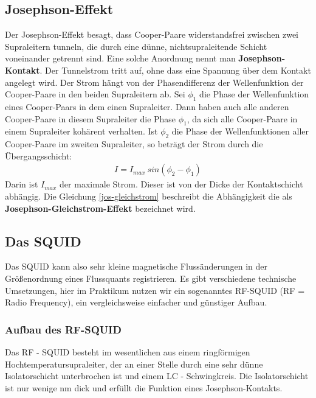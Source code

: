 \documentclass[12pt]{article}
\begin{document}
\subsection{Josephson-Effekt}
\label{josephson}

Der Josephson-Effekt besagt, dass Cooper-Paare widerstandsfrei zwischen zwei Supraleitern tunneln, die durch eine dünne, nichtsupraleitende Schicht voneinander getrennt sind. Eine solche Anordnung nennt man \textbf{Josephson-Kontakt}. Der Tunnelstrom tritt auf, ohne dass eine Spannung über dem Kontakt angelegt wird. Der Strom hängt von der Phasendifferenz der Wellenfunktion der Cooper-Paare in den beiden Supraleitern ab. Sei $\phi_1$ die Phase der Wellenfunktion eines Cooper-Paars in dem einen Supraleiter. Dann haben auch alle anderen Cooper-Paare in diesem Supraleiter die Phase $\phi_1$, da sich alle Cooper-Paare in einem Supraleiter kohärent verhalten. Ist $\phi_2$ die Phase der Wellenfunktionen aller Cooper-Paare im zweiten Supraleiter, so beträgt der Strom durch die Übergangsschicht:
\begin{align}
\label{jos-gleichstrom}
 I = I_{max}~sin(\phi_2 - \phi_1)
\end{align}
Darin ist $I_{max}$ der maximale Strom. Dieser ist von der Dicke der Kontaktschicht abhängig. Die Gleichung \ref{jos-gleichstrom} beschreibt die Abhängigkeit die als \textbf{Josephson-Gleichstrom-Effekt} bezeichnet wird.


\subsection{Das SQUID}

Das SQUID kann also sehr kleine magnetische Flussänderungen in der Größenordnung eines Flussquants registrieren. Es gibt verschiedene technische Umsetzungen, hier im Praktikum  nutzen wir ein sogenanntes RF-SQUID (RF = Radio Frequency),  ein vergleichsweise einfacher und günstiger Aufbau.

\subsubsection{Aufbau des RF-SQUID}

Das RF - SQUID besteht im wesentlichen aus einem ringförmigen Hochtemperatursupraleiter, der an einer Stelle durch eine sehr dünne Isolatorschicht unterbrochen ist und einem LC - Schwingkreis. Die Isolatorschicht ist nur wenige nm dick  und erfüllt die Funktion eines Josephson-Kontakts.
\end{document}
